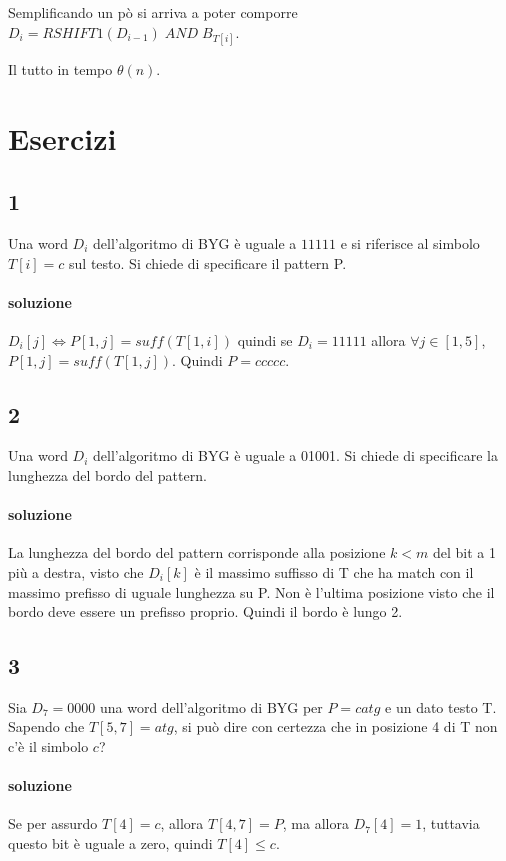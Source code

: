 Semplificando un p\`o si arriva a poter comporre $D_i = RSHIFT1(D_{i-1}) \; AND \; B_{T[i]}$.

Il tutto in tempo $\theta(n)$.

\section{Esercizi}

\subsection{1}

Una word $D_i$ dell'algoritmo di BYG è uguale a $11111$ e si riferisce al simbolo $T[i]=c$ sul testo. Si chiede di specificare il pattern P.

\paragraph{soluzione} $D_i[j] \Leftrightarrow P[1,j] = suff(T[1,i])$ quindi se $D_i = 11111$ allora $\forall j \in [1,5]$, $P[1,j] = suff(T[1,j])$. Quindi $P = ccccc$.

\subsection{2}

Una word $D_i$ dell'algoritmo di BYG \`e uguale a 01001. Si chiede di specificare la lunghezza del bordo del pattern.

\paragraph{soluzione} La lunghezza del bordo del pattern corrisponde alla posizione $k < m$ del bit a 1 pi\`u a destra, visto che $D_i[k]$ \`e il massimo suffisso di T che ha match con il massimo prefisso di uguale lunghezza su P. Non \`e l'ultima posizione visto che il bordo deve essere un prefisso proprio. Quindi il bordo \`e lungo 2.

\subsection{3}

Sia $D_7 = 0000$ una word dell’algoritmo di BYG per $P=catg$ e un dato testo T. Sapendo che $T[5,7] = atg$, si pu\`o dire con certezza che in posizione 4 di T non c'\`e il simbolo $c$?

\paragraph{soluzione} Se per assurdo $T[4] = c$, allora $T[4,7] = P$, ma allora $D_7[4] = 1$, tuttavia questo bit \`e uguale a zero, quindi $T[4] \leq c$.

